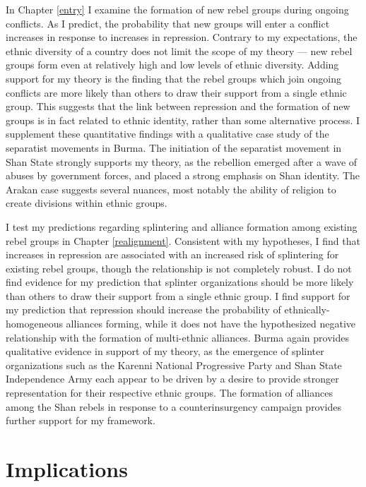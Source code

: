 \documentclass[12pt,]{book}
\theoremstyle{definition}
\theoremstyle{definition}
\theoremstyle{remark}
\begin{document}
In Chapter \ref{entry} I examine the formation of new rebel groups
during ongoing conflicts. As I predict, the probability that new groups
will enter a conflict increases in response to increases in repression.
Contrary to my expectations, the ethnic diversity of a country does not
limit the scope of my theory --- new rebel groups form even at
relatively high and low levels of ethnic diversity. Adding support for
my theory is the finding that the rebel groups which join ongoing
conflicts are more likely than others to draw their support from a
single ethnic group. This suggests that the link between repression and
the formation of new groups is in fact related to ethnic identity,
rather than some alternative process. I supplement these quantitative
findings with a qualitative case study of the separatist movements in
Burma. The initiation of the separatist movement in Shan State strongly
supports my theory, as the rebellion emerged after a wave of abuses by
government forces, and placed a strong emphasis on Shan identity. The
Arakan case suggests several nuances, most notably the ability of
religion to create divisions within ethnic groups.

I test my predictions regarding splintering and alliance formation among
existing rebel groups in Chapter \ref{realignment}. Consistent with my
hypotheses, I find that increases in repression are associated with an
increased risk of splintering for existing rebel groups, though the
relationship is not completely robust. I do not find evidence for my
prediction that splinter organizations should be more likely than others
to draw their support from a single ethnic group. I find support for my
prediction that repression should increase the probability of
ethnically-homogeneous alliances forming, while it does not have the
hypothesized negative relationship with the formation of multi-ethnic
alliances. Burma again provides qualitative evidence in support of my
theory, as the emergence of splinter organizations such as the Karenni
National Progressive Party and Shan State Independence Army each appear
to be driven by a desire to provide stronger representation for their
respective ethnic groups. The formation of alliances among the Shan
rebels in response to a counterinsurgency campaign provides further
support for my framework.

\section{Implications}\label{implications}
\end{document}

